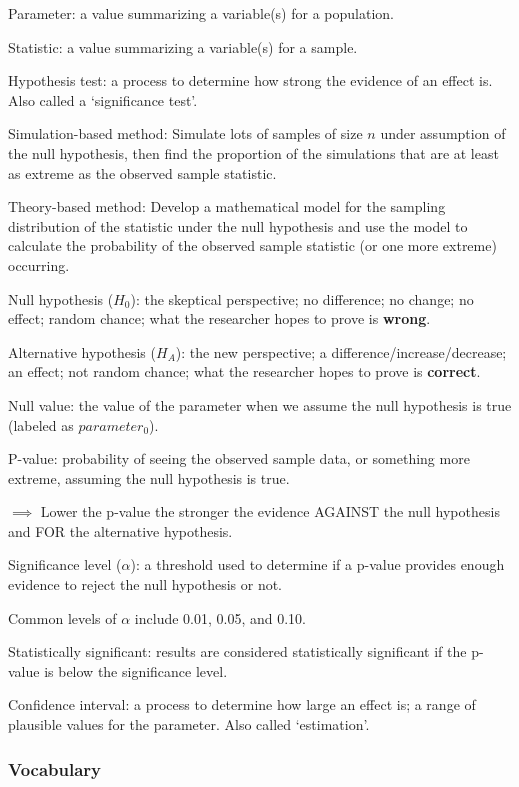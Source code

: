 \documentclass[
]{report}
\newcommand{\rgi}{\hspace{24pt}}  %
\begin{document}
Parameter: a value summarizing a variable(s) for a population.

Statistic: a value summarizing a variable(s) for a sample.

Hypothesis test: a process to determine how strong the evidence of an effect is. Also called a `significance test'.

Simulation-based method: Simulate lots of samples of size \(n\) under assumption of the null hypothesis, then find the proportion of the simulations that are at least as extreme as the observed sample statistic.

Theory-based method: Develop a mathematical model for the sampling distribution of the statistic under the null hypothesis and use the model to calculate the probability of the observed sample statistic (or one more extreme) occurring.

Null hypothesis (\(H_0\)): the skeptical perspective; no difference; no change; no effect; random chance; what the researcher hopes to prove is \textbf{wrong}.

Alternative hypothesis (\(H_A\)): the new perspective; a difference/increase/decrease; an effect; not random chance; what the researcher hopes to prove is \textbf{correct}.

Null value: the value of the parameter when we assume the null hypothesis is true (labeled as \(parameter_0\)).

P-value: probability of seeing the observed sample data, or something more extreme, assuming the null hypothesis is true.

\(\implies\) Lower the p-value the stronger the evidence AGAINST the null hypothesis and FOR the alternative hypothesis.

Significance level (\(\alpha\)): a threshold used to determine if a p-value provides enough evidence to reject the null hypothesis or not.

\rgi Common levels of \(\alpha\) include 0.01, 0.05, and 0.10.

Statistically significant: results are considered statistically significant if the p-value is below the significance level.

Confidence interval: a process to determine how large an effect is; a range of plausible values for the parameter. Also called `estimation'.

\hypertarget{vocabulary-12}{%
\subsubsection*{Vocabulary}\label{vocabulary-12}}
\end{document}
